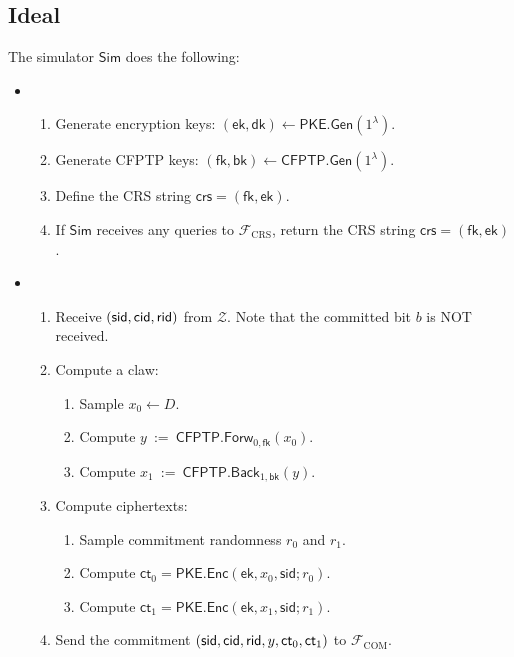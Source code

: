 \documentclass[11pt,letterpaper]{article}
\theoremstyle{plain} %
\theoremstyle{definition} %
\theoremstyle{remark} %
\newcommand{\eqdef}{\ {:=} \ }
\newcommand{\Input}{x}
\newcommand{\SecParam}{\lambda}
\newcommand{\PKE}{\mathsf{PKE}}
\newcommand{\Gen}{\mathsf{Gen}}
\newcommand{\Enc}{\mathsf{Enc}}
\newcommand{\EncKey}{\mathsf{ek}}
\newcommand{\DecKey}{\mathsf{dk}}
\newcommand{\Ct}{\mathsf{ct}}
\newcommand{\Rand}{r}
\newcommand{\CFPTP}{\mathsf{CFPTP}}
\newcommand{\Forw}{\mathsf{Forw}}
\newcommand{\Back}{\mathsf{Back}}
\newcommand{\ForwKey}{\mathsf{fk}}
\newcommand{\BackKey}{\mathsf{bk}}
\newcommand{\Domain}{D}
\newcommand{\Output}{y}
\newcommand{\Simulator}{{\mathsf{Sim}}} %
\newcommand{\Environment}{{\mathcal{Z}}} %
\newcommand{\IF}{\mathcal{F}} %
\newcommand{\sid}{\mathsf{sid}}
\newcommand{\IFCrs}{\IF_{\mathrm{CRS}}}
\newcommand{\crs}{\mathsf{crs}}
\newcommand{\IFCom}{\IF_{\mathrm{COM}}}
\newcommand{\CommBit}{b}
\begin{document}
\subsection{Ideal}
\label{sec:ideal-distr}


The simulator $\Simulator$ does the following:
\begin{itemize}
\item \parhead{Simulate $\IFCrs$}
\begin{enumerate}[nolistsep]
    \item Generate encryption keys: $(\EncKey, \DecKey) \gets \PKE.\Gen(1^{\SecParam})$.
    \item Generate CFPTP keys: $(\ForwKey,\BackKey) \gets \CFPTP.\Gen(1^{\SecParam})$.
    \item Define the CRS string $\crs = (\ForwKey, \EncKey)$.
    \item If $\Simulator$ receives any queries to $\IFCrs$, return the CRS string $\crs = (\ForwKey, \EncKey)$.
\end{enumerate}

\item {}
\begin{enumerate}[nolistsep]
	\item Receive $(\sid, \CommitterId, \ReceiverId)$ from $\Environment$. Note that the committed bit $\CommBit$ is NOT received.
    \item Compute a claw:
    \begin{enumerate}[nolistsep]
        \item Sample $\Input_0\gets\Domain$.
        \item Compute $\Output \eqdef \CFPTP.\Forw_{0,\ForwKey}(\Input_0)$.
        \item Compute $\Input_1 \eqdef \CFPTP.\Back_{1,\BackKey}(\Output)$.
    \end{enumerate}
    \item Compute ciphertexts:
    \begin{enumerate}[nolistsep]
        \item Sample commitment randomness $\Rand_{0}$ and $\Rand_{1}$.
    	\item Compute $\Ct_{0} = \PKE.\Enc(\EncKey,\Input_{0}, \sid; \Rand_{0})$.
    	\item Compute $\Ct_{1} = \PKE.\Enc(\EncKey,\Input_{1}, \sid; \Rand_{1})$.
    \end{enumerate}
	\item Send the commitment $(\sid,\CommitterId,\ReceiverId,\Output, \Ct_0, \Ct_1)$ to $\IFCom$.
\end{enumerate}


\end{itemize}
\end{document}
